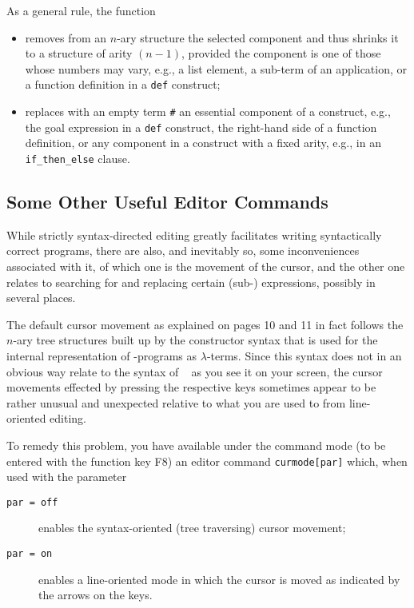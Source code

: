 As a general rule, the { function}
\begin{itemize}
\item removes from an $n$-ary structure the selected component and
thus shrinks it to a structure of arity $(n-1)$, provided the component
is one of those whose numbers may vary, e.g., a list element,
a sub-term of an application,
 or a function definition in a {\tt def} construct;
\item replaces with an empty term {\tt \#}
 an essential component of a construct, e.g., the
goal expression in a {\tt def} construct, the right-hand side of a
function definition, or any component in a construct with a
fixed arity, e.g., in an {\tt if\_then\_else} clause. 
\end{itemize}

\subsection{Some Other Useful Editor Commands}

While strictly syntax-directed editing greatly facilitates writing
syntactically correct programs, there are also, and inevitably so, some inconveniences
associated with it, of which one is the movement of the cursor, and the other one
relates to searching for and replacing certain (sub-) expressions, possibly in several places.

The default cursor movement as explained on pages 10 and 11 in fact follows 
the $n$-ary tree structures built up by the constructor syntax that is used for
the internal representation of \kir-programs as $\lambda$-terms.
 Since this syntax does not in an obvious way
relate to the syntax of \kir~ as you see it on  your screen, 
the cursor movements effected by pressing
the respective keys sometimes appear to be rather unusual and unexpected relative to what you
are used to from line-oriented editing.  

To remedy this problem, you have available under the command mode (to be entered with
the function key F8) an editor command {\tt curmode[par]} which, when used 
with the parameter
\begin{description}
\item[{\tt par = off}] enables the syntax-oriented (tree traversing) cursor movement;
\item[{\tt par = on}] enables a line-oriented mode in which the cursor is moved as
indicated by the arrows on the keys.
\end{description}

